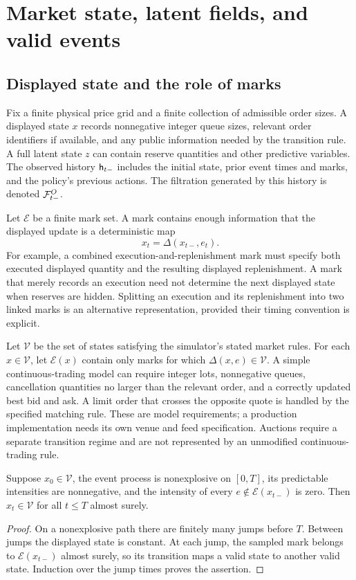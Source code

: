 \section{Market state, latent fields, and valid events}\label{sec:state}
\subsection{Displayed state and the role of marks}
Fix a finite physical price grid and a finite collection of admissible order sizes. A displayed state $x$ records nonnegative integer queue sizes, relevant order identifiers if available, and any public information needed by the transition rule. A full latent state $z$ can contain reserve quantities and other predictive variables. The observed history $\mathsf h_{t-}$ includes the initial state, prior event times and marks, and the policy's previous actions. The filtration generated by this history is denoted $\mathcal F^O_{t-}$.

Let $\mathcal E$ be a finite mark set. A mark contains enough information that the displayed update is a deterministic map
\begin{equation}\label{eq:transition}
 x_t=\Delta(x_{t-},e_t).
\end{equation}
For example, a combined execution-and-replenishment mark must specify both executed displayed quantity and the resulting displayed replenishment. A mark that merely records an execution need not determine the next displayed state when reserves are hidden. Splitting an execution and its replenishment into two linked marks is an alternative representation, provided their timing convention is explicit.

Let $\mathcal V$ be the set of states satisfying the simulator's stated market rules. For each $x\in\mathcal V$, let $\mathcal E(x)$ contain only marks for which $\Delta(x,e)\in\mathcal V$. A simple continuous-trading model can require integer lots, nonnegative queues, cancellation quantities no larger than the relevant order, and a correctly updated best bid and ask. A limit order that crosses the opposite quote is handled by the specified matching rule. These are model requirements; a production implementation needs its own venue and feed specification. Auctions require a separate transition regime and are not represented by an unmodified continuous-trading rule.

\begin{proposition}\label{prop:validity}
Suppose $x_0\in\mathcal V$, the event process is nonexplosive on $[0,T]$, its predictable intensities are nonnegative, and the intensity of every $e\notin\mathcal E(x_{t-})$ is zero. Then $x_t\in\mathcal V$ for all $t\le T$ almost surely.
\end{proposition}
\begin{proof}
On a nonexplosive path there are finitely many jumps before $T$. Between jumps the displayed state is constant. At each jump, the sampled mark belongs to $\mathcal E(x_{t-})$ almost surely, so its transition maps a valid state to another valid state. Induction over the jump times proves the assertion.
\end{proof}


